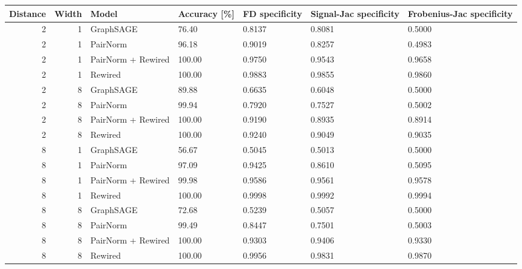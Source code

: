 \begin{tabular}{rrlllll}
\toprule
Distance & Width & Model & Accuracy [\%] & FD specificity & Signal-Jac specificity & Frobenius-Jac specificity \\
\midrule
2 & 1 & GraphSAGE & 76.40 & 0.8137 & 0.8081 & 0.5000 \\
2 & 1 & PairNorm & 96.18 & 0.9019 & 0.8257 & 0.4983 \\
2 & 1 & PairNorm + Rewired & 100.00 & 0.9750 & 0.9543 & 0.9658 \\
2 & 1 & Rewired & 100.00 & 0.9883 & 0.9855 & 0.9860 \\
2 & 8 & GraphSAGE & 89.88 & 0.6635 & 0.6048 & 0.5000 \\
2 & 8 & PairNorm & 99.94 & 0.7920 & 0.7527 & 0.5002 \\
2 & 8 & PairNorm + Rewired & 100.00 & 0.9190 & 0.8935 & 0.8914 \\
2 & 8 & Rewired & 100.00 & 0.9240 & 0.9049 & 0.9035 \\
8 & 1 & GraphSAGE & 56.67 & 0.5045 & 0.5013 & 0.5000 \\
8 & 1 & PairNorm & 97.09 & 0.9425 & 0.8610 & 0.5095 \\
8 & 1 & PairNorm + Rewired & 99.98 & 0.9586 & 0.9561 & 0.9578 \\
8 & 1 & Rewired & 100.00 & 0.9998 & 0.9992 & 0.9994 \\
8 & 8 & GraphSAGE & 72.68 & 0.5239 & 0.5057 & 0.5000 \\
8 & 8 & PairNorm & 99.49 & 0.8447 & 0.7501 & 0.5003 \\
8 & 8 & PairNorm + Rewired & 100.00 & 0.9303 & 0.9406 & 0.9330 \\
8 & 8 & Rewired & 100.00 & 0.9956 & 0.9831 & 0.9870 \\
\bottomrule
\end{tabular}
